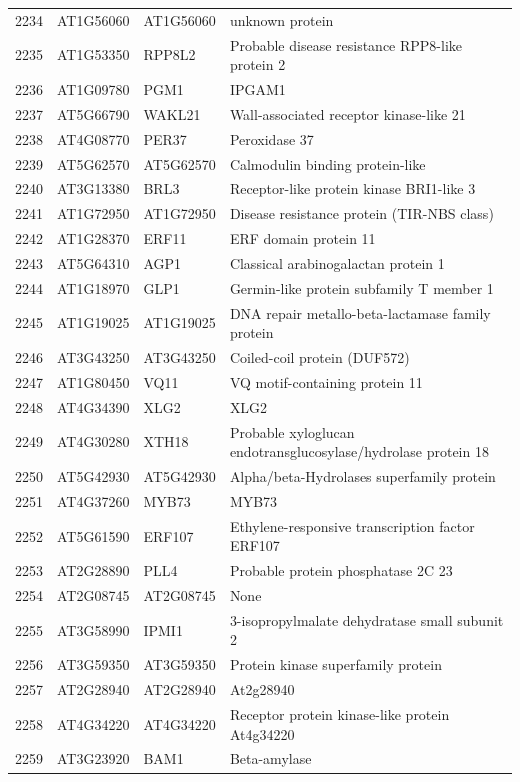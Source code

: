 \documentclass[11pt]{article}
\begin{document}
\begin{center}
\begin{tabular}{rlll}
2234 & AT1G56060 & AT1G56060 & unknown protein\\
2235 & AT1G53350 & RPP8L2 & Probable disease resistance RPP8-like protein 2\\
2236 & AT1G09780 & PGM1 & IPGAM1\\
2237 & AT5G66790 & WAKL21 & Wall-associated receptor kinase-like 21\\
2238 & AT4G08770 & PER37 & Peroxidase 37\\
2239 & AT5G62570 & AT5G62570 & Calmodulin binding protein-like\\
2240 & AT3G13380 & BRL3 & Receptor-like protein kinase BRI1-like 3\\
2241 & AT1G72950 & AT1G72950 & Disease resistance protein (TIR-NBS class)\\
2242 & AT1G28370 & ERF11 & ERF domain protein 11\\
2243 & AT5G64310 & AGP1 & Classical arabinogalactan protein 1\\
2244 & AT1G18970 & GLP1 & Germin-like protein subfamily T member 1\\
2245 & AT1G19025 & AT1G19025 & DNA repair metallo-beta-lactamase family protein\\
2246 & AT3G43250 & AT3G43250 & Coiled-coil protein (DUF572)\\
2247 & AT1G80450 & VQ11 & VQ motif-containing protein 11\\
2248 & AT4G34390 & XLG2 & XLG2\\
2249 & AT4G30280 & XTH18 & Probable xyloglucan endotransglucosylase/hydrolase protein 18\\
2250 & AT5G42930 & AT5G42930 & Alpha/beta-Hydrolases superfamily protein\\
2251 & AT4G37260 & MYB73 & MYB73\\
2252 & AT5G61590 & ERF107 & Ethylene-responsive transcription factor ERF107\\
2253 & AT2G28890 & PLL4 & Probable protein phosphatase 2C 23\\
2254 & AT2G08745 & AT2G08745 & None\\
2255 & AT3G58990 & IPMI1 & 3-isopropylmalate dehydratase small subunit 2\\
2256 & AT3G59350 & AT3G59350 & Protein kinase superfamily protein\\
2257 & AT2G28940 & AT2G28940 & At2g28940\\
2258 & AT4G34220 & AT4G34220 & Receptor protein kinase-like protein At4g34220\\
2259 & AT3G23920 & BAM1 & Beta-amylase\\

\end{tabular}
\end{center}
\end{document}
